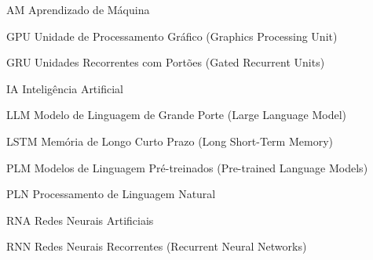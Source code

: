 \begin{simbolos}
    \label{sec:lista_simbolos} %
    \item[AM] Aprendizado de Máquina
    \item[GPU] Unidade de Processamento Gráfico (Graphics Processing Unit)
    \item[GRU] Unidades Recorrentes com Portões (Gated Recurrent Units)
    \item[IA] Inteligência Artificial
    \item[LLM] Modelo de Linguagem de Grande Porte (Large Language Model)
    \item[LSTM] Memória de Longo Curto Prazo (Long Short-Term Memory)
    \item[PLM] Modelos de Linguagem Pré-treinados (Pre-trained Language Models)
    \item[PLN] Processamento de Linguagem Natural
    \item[RNA] Redes Neurais Artificiais
    \item[RNN] Redes Neurais Recorrentes (Recurrent Neural Networks)
\end{simbolos}

